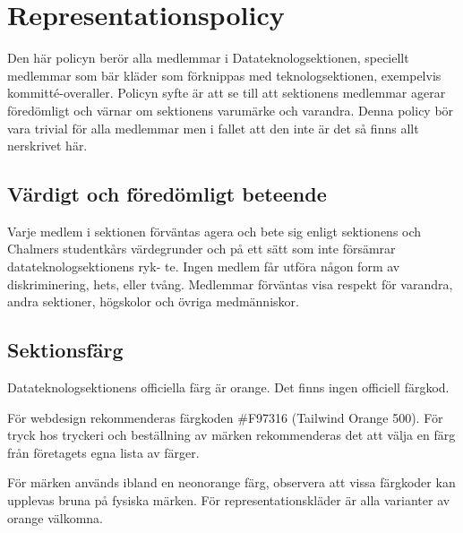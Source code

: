 \section{Representationspolicy}
Den här policyn berör alla medlemmar i Datateknologsektionen, speciellt medlemmar som
bär kläder som förknippas med teknologsektionen, exempelvis kommitté-overaller. Policyn
syfte är att se till att sektionens medlemmar agerar föredömligt och värnar om sektionens
varumärke och varandra. Denna policy bör vara trivial för alla medlemmar men i fallet att
den inte är det så finns allt nerskrivet här.

\subsection{Värdigt och föredömligt beteende}
Varje medlem i sektionen förväntas agera och bete sig enligt sektionens och Chalmers
studentkårs värdegrunder och på ett sätt som inte försämrar datateknologsektionens ryk-
te. Ingen medlem får utföra någon form av diskriminering, hets, eller tvång. Medlemmar
förväntas visa respekt för varandra, andra sektioner, högskolor och övriga medmänniskor.

\subsection{Sektionsfärg}

Datateknologsektionens officiella färg är orange. Det finns ingen officiell färgkod.

För webdesign rekommenderas färgkoden \#F97316 (Tailwind Orange 500). För tryck hos tryckeri och beställning av märken rekommenderas det att välja en färg från företagets egna lista av färger. 
 
För märken används ibland en neonorange färg, observera att vissa färgkoder kan upplevas bruna på fysiska märken. För representationskläder är alla varianter av orange välkomna. 
